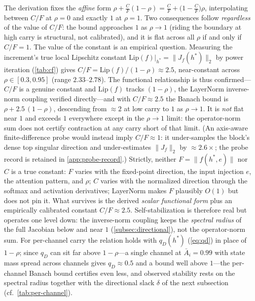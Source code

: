 \documentclass[11pt]{article}
\begin{document}
The derivation fixes the \emph{affine} form $\rho + \tfrac{C}{F}(1-\rho) = \tfrac{C}{F} + \big(1 - \tfrac{C}{F}\big)\rho$, interpolating between $C/F$ at $\rho = 0$ and exactly $1$ at $\rho = 1$. Two consequences follow \emph{regardless} of the value of $C/F$: the bound approaches $1$ as $\rho \to 1$ (riding the boundary at high carry is structural, not calibrated), and it is flat across all $\rho$ if and only if $C/F = 1$. The value of the constant is an empirical question. Measuring the increment's true local Lipschitz constant $\text{Lip}(f)|_{h^*} = \|J_f(h^*)\|_2$ by power iteration (\cref{tab:cf}) gives $C/F = \text{Lip}(f)/(1-\rho) \approx 2.5$, near-constant across $\rho \in [0.3, 0.95]$ (range $2.33$--$2.78$). The functional relationship is thus confirmed---$C/F$ is a genuine constant and $\text{Lip}(f)$ tracks $(1-\rho)$, the LayerNorm inverse-norm coupling verified directly---and with $C/F \approx 2.5$ the Banach bound is $\rho + 2.5\,(1-\rho)$, descending from $\approx 2$ at low carry to $1$ as $\rho \to 1$. It is \emph{not} flat near $1$ and exceeds $1$ everywhere except in the $\rho \to 1$ limit: the operator-norm sum does not certify contraction at any carry short of that limit. (An axis-aware finite-difference probe would instead imply $C/F \approx 1$: it under-samples the block's dense top singular direction and under-estimates $\|J_f\|_2$ by $\approx 2.6\times$; the probe record is retained in \cref{app:probe-record}.) Strictly, neither $F = \|f(h^*,e)\|$ nor $C$ is a true constant: $F$ varies with the fixed-point direction, the input injection $e$, the attention pattern, and $\rho$; $C$ varies with the normalized direction through the softmax and activation derivatives; LayerNorm makes $F$ plausibly $O(1)$ but does not pin it. What survives is the derived \emph{scalar functional form} plus an empirically calibrated constant $C/F \approx 2.5$. Self-stabilization is therefore real but operates one level down: the inverse-norm coupling keeps the \emph{spectral radius} of the full Jacobian below and near $1$ (\cref{subsec:directional}), not the operator-norm sum. For per-channel carry the relation holds with $q_D(h^*)$ (\cref{eq:qd}) in place of $1-\rho$; since $q_D$ can sit far above $1-\rho$---a single channel at $\bar{A}_i = 0.99$ with state mass spread across channels gives $q_D \approx 0.5$ and a bound well above $1$---the per-channel Banach bound certifies even less, and observed stability rests on the spectral radius together with the directional slack $\delta$ of the next subsection (cf.\ \cref{tab:per-channel}).
\end{document}
